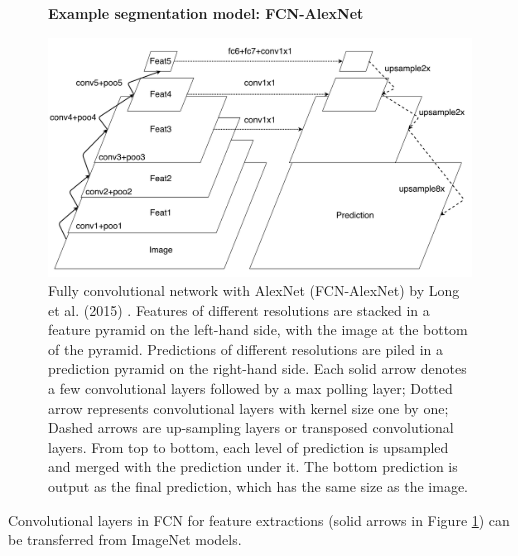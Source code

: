
\begin{figure}[t]
\centering
\textbf{Example segmentation model: FCN-AlexNet}\par\medskip
   \includegraphics[width=\linewidth]{img/fcn}
\caption{
Fully convolutional network with AlexNet (FCN-AlexNet) by Long et al. (2015)  \cite{long2015fully}.
Features of different resolutions are stacked in a feature pyramid on the left-hand side, with the image at the bottom of the pyramid.
Predictions of different resolutions are piled in a prediction pyramid on the right-hand side.
Each solid arrow denotes a few convolutional layers followed by a max polling layer; Dotted arrow represents convolutional layers with kernel size one by one; Dashed arrows are up-sampling layers or transposed convolutional layers.
From top to bottom, each level of prediction is upsampled and merged with the prediction under it.
The bottom prediction is output as the final prediction, which has the same size as the image.
}
\label{fig:fcn}
\end{figure}


Convolutional layers in FCN for feature extractions (solid arrows in Figure \ref{fig:fcn}) can be transferred from ImageNet models.
